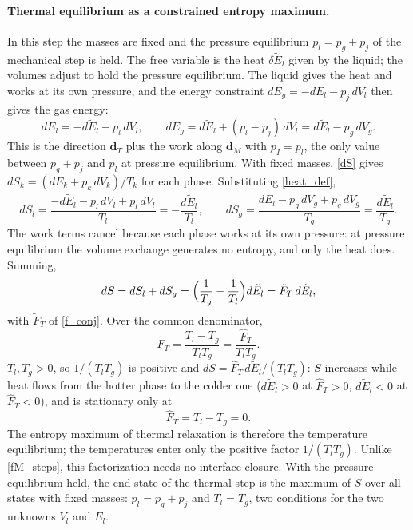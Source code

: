 \paragraph{Thermal equilibrium as a constrained entropy maximum.}
In this step the masses are fixed and the pressure equilibrium $p_l=p_g+p_{j}$ of the mechanical step is held. The free variable is the heat $\delta\tilde{E}_l$ given by the liquid; the volumes adjust to hold the pressure equilibrium. The liquid gives the heat and works at its own pressure, and the energy constraint $dE_g=-dE_l-p_{j}\,dV_l$ then gives the gas energy:
\begin{equation}\label{heat_def}
dE_l=-d\tilde{E}_l-p_l\,dV_l,\qquad dE_g=d\tilde{E}_l+(p_l-p_{j})\,dV_l=d\tilde{E}_l-p_g\,dV_g .
\end{equation}
This is the direction $\boldsymbol{d}_T$ plus the work along $\boldsymbol{d}_M$ with $p_I=p_l$, the only value between $p_g+p_{j}$ and $p_l$ at pressure equilibrium. With fixed masses, \eqref{dS} gives $dS_k=(dE_k+p_k\,dV_k)/T_k$ for each phase. Substituting \eqref{heat_def},
\begin{equation}\label{dS_T_phases}
dS_l=\frac{-d\tilde{E}_l-p_l\,dV_l+p_l\,dV_l}{T_l}=-\frac{d\tilde{E}_l}{T_l},\qquad
dS_g=\frac{d\tilde{E}_l-p_g\,dV_g+p_g\,dV_g}{T_g}=\frac{d\tilde{E}_l}{T_g}.
\end{equation}
The work terms cancel because each phase works at its own pressure: at pressure equilibrium the volume exchange generates no entropy, and only the heat does. Summing,
\begin{equation}\label{dS_T_sum}
dS=dS_l+dS_g=\Bigl(\frac1{T_g}-\frac1{T_l}\Bigr)d\tilde{E}_l=\tilde{F}_T\,d\tilde{E}_l,
\end{equation}
with $\tilde{F}_T$ of \eqref{f_conj}. Over the common denominator,
\begin{equation}\label{fT_steps}
\tilde{F}_T=\frac{T_l-T_g}{T_lT_g}=\frac{\hat{F}_T}{T_lT_g}.
\end{equation}
$T_l,T_g>0$, so $1/(T_lT_g)$ is positive and $dS=\hat{F}_T\,d\tilde{E}_l/(T_lT_g)$: $S$ increases while heat flows from the hotter phase to the colder one ($d\tilde{E}_l>0$ at $\hat{F}_T>0$, $d\tilde{E}_l<0$ at $\hat{F}_T<0$), and is stationary only at
\begin{equation}
\hat{F}_T=T_l-T_g=0 .
\end{equation}
The entropy maximum of thermal relaxation is therefore the temperature equilibrium; the temperatures enter only the positive factor $1/(T_lT_g)$. Unlike \eqref{fM_steps}, this factorization needs no interface closure. With the pressure equilibrium held, the end state of the thermal step is the maximum of $S$ over all states with fixed masses: $p_l=p_g+p_{j}$ and $T_l=T_g$, two conditions for the two unknowns $V_l$ and $E_l$.


